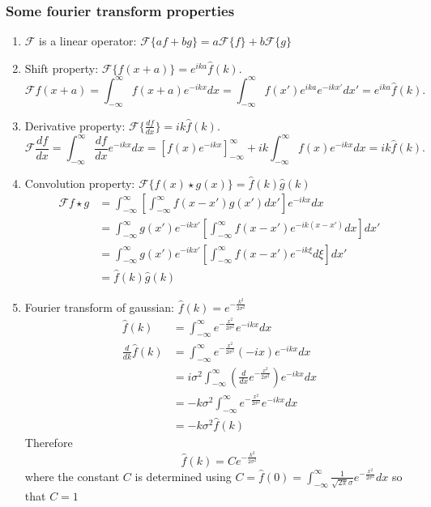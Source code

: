 \documentclass[11pt,a4paper,noindent]{article}
\begin{document}
\subsubsection*{Some fourier transform properties}
\begin{enumerate}
\item $\mathcal{F}$ is a linear operator: $\mathcal{F}\{af + bg\} = a\mathcal{F}\{f\} + b\mathcal{F}\{g\}$
\item Shift property: $\mathcal{F}\{f(x+a)\} = e^{ika} \hat{f}(k).$
\begin{equation}
\mathcal{F}{f(x+a)} = \int_{-\infty}^{\infty} f(x+a) e^{-ikx} dx
 				    = \int_{-\infty}^{\infty} f(x') e^{ika} e^{-ikx'} dx'
 				   = e^{ika} \hat{f}(k).
\end{equation}
\item Derivative property: $\mathcal{F}\{\frac{df}{dx}\} = ik \hat{f}(k).$
\begin{equation}
\mathcal{F}{\frac{df}{dx}} = \int_{-\infty}^{\infty} \frac{df}{dx} e^{-ikx} dx
= \left[f(x)e^{-ikx}\right]^\infty_{-\infty}+ik\int_{-\infty}^{\infty}f(x)e^{-ikx}dx
 				   = ik\hat{f}(k).
\end{equation}
\item Convolution property: $\mathcal{F}\{f(x) \star g(x)\} = \hat{f}(k)\hat{g}(k)$
\begin{align}
\mathcal{F}{f \star g} &= \int_{-\infty}^{\infty} \left [ \int_{-\infty}^{\infty} f(x-x')g(x')dx' \right ] e^{-ikx} dx \\
&= \int_{-\infty}^{\infty} g(x') e^{-ikx'} \left [ \int_{-\infty}^{\infty} f(x-x')e^{-ik(x-x')}dx \right ]  dx' \\
&= \int_{-\infty}^{\infty} g(x') e^{-ikx'} \left [ \int_{-\infty}^{\infty} f(x-x')e^{-ik\xi}d\xi \right ]  dx' \\
&= \hat{f}(k)\hat{g}(k)
\end{align}

\item Fourier transform of gaussian: $\hat{f}(k) = e^{-\frac{k^2}{2\sigma^2}}$
\begin{align}
\hat{f}(k) &= \int_{-\infty}^{\infty}  e^{-\frac{x^2}{2\sigma^2}} e^{-ikx} dx \\
\frac{d}{dk} \hat{f}(k) &=  \int_{-\infty}^{\infty}  e^{-\frac{x^2}{2\sigma^2}} (-ix) e^{-ikx} dx \\
&= i\sigma^2 \int_{-\infty}^{\infty}  \left(\frac{d}{dx} e^{-\frac{x^2}{2\sigma^2}}\right)  e^{-ikx} dx \\
&= -k\sigma^2 \int_{-\infty}^{\infty}  e^{-\frac{x^2}{2\sigma^2}} e^{-ikx} dx \\
&= -k\sigma^2 \hat{f}(k)
\end{align}
Therefore
\begin{equation}
\hat{f}(k) = C e^{-\frac{k^2}{2\sigma^2}}
\end{equation}
where the constant $C$ is determined using $C = \hat{f}(0) = \int_{-\infty}^{\infty} \frac{1}{\sqrt{2\pi} \sigma} e^{-\frac{x^2}{2\sigma^2}} dx$ so that $C = 1$
\end{enumerate}
\end{document}
